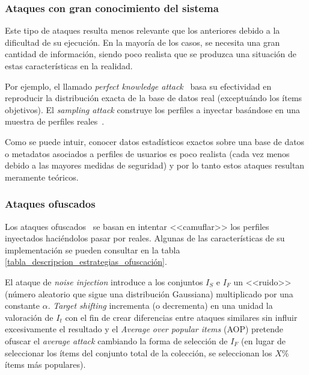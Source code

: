 \subsubsection{Ataques con gran conocimiento del sistema}

Este tipo de ataques resulta menos relevante que los anteriores debido a la dificultad de su ejecución. En la mayoría de los casos, se necesita una gran cantidad de información, siendo poco realista que se produzca una situación de estas características en la realidad.

Por ejemplo, el llamado \textit{perfect knowledge attack}~\cite{Mobasher2006Thesis} basa su efectividad en reproducir la distribución exacta de la base de datos real (exceptuándo los ítems objetivos). El \textit{sampling attack} construye los perfiles a inyectar basándose en una muestra de perfiles reales~\cite{mingdan2018ShillingAttacksAReview}.

Como se puede intuir, conocer datos estadísticos exactos sobre una base de datos o metadatos asociados a perfiles de usuarios es poco realista (cada vez menos debido a las mayores medidas de seguridad) y por lo tanto estos ataques resultan meramente teóricos.

\subsubsection{Ataques ofuscados}

Los ataques ofuscados~\cite{mingdan2018ShillingAttacksAReview} se basan en intentar <<camuflar>> los perfiles inyectados haciéndolos pasar por reales. Algunas de las características de su implementación se pueden consultar en la tabla \ref{tabla_descripcion_estrategias_ofuscación}.

El ataque de \textit{noise injection} introduce a los conjuntos $I_S$ e $I_F$ un <<ruido>> (número aleatorio que sigue una distribución Gaussiana) multiplicado por una constante $\alpha$. \textit{Target shifting} incrementa (o decrementa) en una unidad la valoración de $I_t$ con el fin de crear diferencias entre ataques similares sin influir excesivamente el resultado y el \textit{Average over popular items} (AOP) pretende ofuscar el \textit{average attack} cambiando la forma de selección de $I_F$ (en lugar de seleccionar los ítems del conjunto total de la colección, se seleccionan los $X\%$ ítems más populares).

